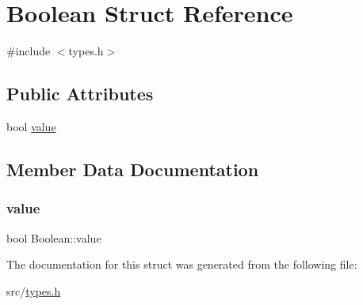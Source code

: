 \hypertarget{struct_boolean}{}\section{Boolean Struct Reference}
\label{struct_boolean}


{\ttfamily \#include $<$types.\+h$>$}

\subsection*{Public Attributes}
\begin{DoxyCompactItemize}
\item 
bool \hyperlink{struct_boolean_a8e44c7f95d984f2dc8c6974f607b2b36}{value}
\end{DoxyCompactItemize}


\subsection{Member Data Documentation}
\mbox{\label{struct_boolean_a8e44c7f95d984f2dc8c6974f607b2b36}} 
\subsubsection{\texorpdfstring{value}{value}}
{\footnotesize\ttfamily bool Boolean\+::value}



The documentation for this struct was generated from the following file\+:\begin{DoxyCompactItemize}
\item 
src/\hyperlink{types_8h}{types.\+h}\end{DoxyCompactItemize}
